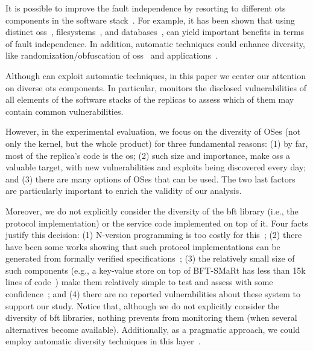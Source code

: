 It is possible to improve the \replicas fault independence by resorting to different \gls{ots} components in the software stack~\cite{Deswarte:1998}. 
For example, it has been shown that using distinct \glspl{os}~\cite{Garcia:2014}, filesystems~\cite{Rodrigues:2001,Bairavasundaram:2009}, and databases~\cite{Gashi:2007}, can yield important benefits in terms of fault independence. In addition, automatic techniques could enhance diversity, like randomization/obfuscation of \glspl{os}~\cite{Roeder:2010} and applications~\cite{King:2016}.

Although \system can exploit automatic techniques, in this paper we center our attention on diverse \gls{ots} components. 
In particular, \system monitors the disclosed vulnerabilities of all elements of the software stacks of the replicas to assess which of them may contain common vulnerabilities.  

However, in the experimental evaluation, we focus on the diversity of OSes (not only the kernel, but the whole product) for three fundamental reasons: (1) by far, most of the replica’s code is the \gls{os}; (2) such size and importance, make \glspl{os} a valuable target, with new vulnerabilities and exploits being discovered every day; and (3) there are many options of OSes that can be used.
The two last factors are particularly important to enrich the validity of our analysis.

Moreover, we do not explicitly consider the diversity of the \gls{bft} library (i.e., the protocol implementation) or the service code implemented on top of it.
Four facts justify this decision: (1) N-version programming is too costly for this~\cite{Avizienis:1977}; (2) there have been some works showing that such protocol implementations can be generated from formally verified specifications~\cite{Hawblitzel:2015,Rahli:2018}; (3) the relatively small size of such components (e.g., a key-value store on top of BFT-SMaRt has less than 15k lines of code~\cite{Bessani:2014}) make them relatively simple to test and assess with some confidence~\cite{Martins:2013,Lee:2014};  and (4) there are no reported vulnerabilities about these system to support our study.
Notice that, although we do not explicitly consider the diversity of \gls{bft} libraries, nothing prevents \system from monitoring them (when several alternatives become available). 
Additionally, as a pragmatic approach, we could employ automatic diversity techniques in this layer~\cite{Platania:2014,Roeder:2010}.




